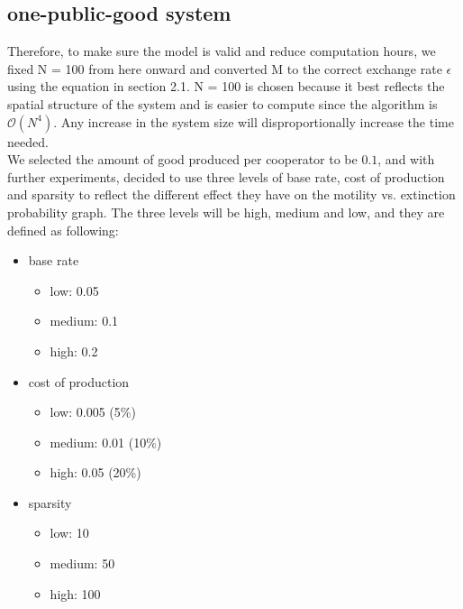 \documentclass[11pt]{article}
\begin{document}
\subsection{one-public-good system}
Therefore, to make sure the model is valid and reduce computation hours, we fixed N = 100 from here onward and converted M to the correct exchange rate $\epsilon$ using the equation in section 2.1. N = 100 is chosen because it best reflects the spatial structure of the system 
and is easier to compute since the algorithm is $\mathcal{O}(N^4)$. Any increase in the system size will disproportionally increase the time needed.\\
We selected the amount of good produced per cooperator to be $0.1$, and with further experiments, decided to use three levels of base rate, cost of production and sparsity to reflect the different effect they have on the motility vs. extinction probability graph. The three levels will be high, medium and low, and they are defined as following:
\begin{itemize}
    \item base rate
    \begin{itemize}
        \item low: 0.05
        \item medium: 0.1
        \item high: 0.2
    \end{itemize}
    \item cost of production
    \begin{itemize}
        \item low: 0.005 (5\%)
        \item medium: 0.01 (10\%)
        \item high: 0.05 (20\%)
    \end{itemize}
    \item sparsity
    \begin{itemize}
        \item low: 10
        \item medium: 50
        \item high: 100
    \end{itemize}
\end{itemize}
\end{document}
